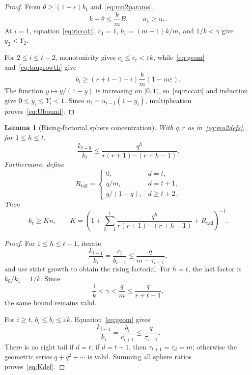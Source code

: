 \documentclass[11pt]{amsart}
\newtheorem{lemma}[theorem]{Lemma}
\theoremstyle{definition}
\newcommand{\eps}{\varepsilon}
\newcommand{\gam}{\gamma}
\newcommand{\Rtail}{R_{\mathrm{tail}}}
\begin{document}
\begin{proof}
From $\theta\ge(1-\eps)b_1$ and~\eqref{eq:mu2params},
\begin{equation}\label{eq:kthetaB}
 k-\theta\le\frac{k}{m}B,
 \qquad u_1\ge u_*.
\end{equation}
At $i=1$, equation~\eqref{eq:riccati}, $c_1=1$, $b_1=(m-1)k/m$, and $1/k<\gam$ give $y_2<Y_2$.

For $2\le i\le t-2$, monotonicity gives $c_i\le c_t<\eps k$, while~\eqref{eq:geom} and~\eqref{eq:taugrowth} give
\[
 b_i\ge(r+t-1-i)\frac{k}{m}(1-m\eps).
\]
The function $y\mapsto y/(1-y)$ is increasing on $[0,1)$, so~\eqref{eq:riccati} and induction give $0\le y_i\le Y_i<1$.  Since $u_i=u_{i-1}(1-y_i)$, multiplication proves~\eqref{eq:Ubound}.
\end{proof}

\begin{lemma}[Rising-factorial sphere concentration]\label{lem:spheres}
With $q,r$ as in~\eqref{eq:mu2defs}, for $1\le h\le t$,
\begin{equation}\label{eq:lefttail}
 \frac{k_{t-h}}{k_t}
 \le\frac{q^h}{r(r+1)\cdots(r+h-1)}.
\end{equation}
Furthermore, define
\begin{equation}\label{eq:righttail}
 \Rtail=
 \begin{cases}
  0,&d=t,\\[2mm]
  q/m,&d=t+1,\\[2mm]
  q/(1-q),&d\ge t+2.
 \end{cases}
\end{equation}
Then
\begin{equation}\label{eq:Kdef}
 k_t\ge Kn,
 \qquad
 K=\left(
 1+\sum_{h=1}^{t}\frac{q^h}{r(r+1)\cdots(r+h-1)}+\Rtail
 \right)^{-1}.
\end{equation}
\end{lemma}

\begin{proof}
For $1\le h\le t-1$, iterate
\[
 \frac{k_{i-1}}{k_i}=\frac{c_i}{b_{i-1}}
 \le\frac{q}{m-\tau_{i-1}},
\]
and use strict growth to obtain the rising factorial.  For $h=t$, the last factor is $k_0/k_1=1/k$.  Since
\[
 \frac1k<\gam<\frac{q}{m}
 \le\frac{q}{r+t-1},
\]
the same bound remains valid.

For $i\ge t$, $b_i\le b_t\le\eps k$.  Equation~\eqref{eq:geom} gives
\[
 \frac{k_{i+1}}{k_i}=\frac{b_i}{c_{i+1}}
 \le\frac{q}{\tau_{i+1}}.
\]
There is no right tail if $d=t$; if $d=t+1$, then $\tau_{t+1}=\tau_d=m$; otherwise the geometric series $q+q^2+\cdots$ is valid.  Summing all sphere ratios proves~\eqref{eq:Kdef}.
\end{proof}
\end{document}
